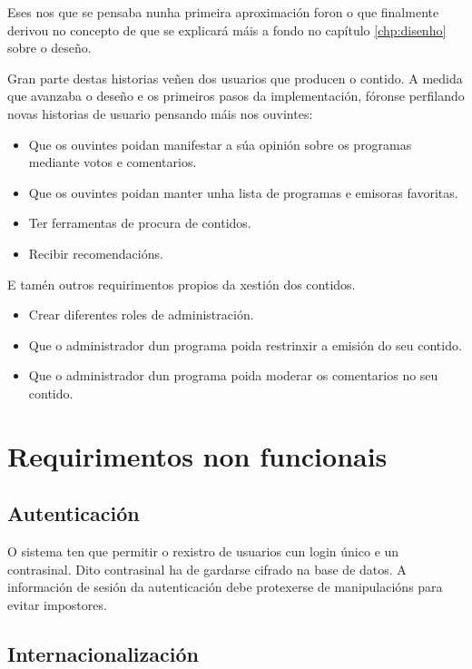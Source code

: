 Eses  nos que se pensaba nunha primeira aproximación foron o que finalmente derivou no concepto de  que se explicará máis a fondo no capítulo \ref{chp:disenho} sobre o deseño.

Gran parte destas historias veñen dos usuarios que producen o contido. A medida que avanzaba o deseño e os primeiros pasos da implementación, fóronse perfilando novas historias de usuario pensando máis nos ouvintes:

\begin{itemize}
	\item Que os ouvintes poidan manifestar a súa opinión sobre os programas mediante votos e comentarios.
	\item Que os ouvintes poidan manter unha lista de programas e emisoras favoritas.
	\item Ter ferramentas de procura de contidos.
	\item Recibir recomendacións.  
\end{itemize}  

E tamén outros requirimentos propios da xestión dos contidos.

\begin{itemize}
	\item Crear diferentes roles de administración.
	\item Que o administrador dun programa poida restrinxir a emisión do seu contido.
	\item Que o administrador dun programa poida moderar os comentarios no seu contido.
\end{itemize}  

\section{Requirimentos non funcionais}

\subsection{Autenticación}

O sistema ten que permitir o rexistro de usuarios cun login único e un contrasinal. Dito contrasinal ha de gardarse cifrado na base de datos. A información de sesión da autenticación debe protexerse de manipulacións para evitar impostores.

\subsection{Internacionalización}


